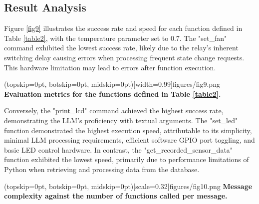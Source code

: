 \documentclass{ieeeaccess}
\begin{document}

\subsection{Result Analysis}
Figure \ref{fig9} illustrates the success rate and speed for each function defined in Table \ref{table2}, with the temperature parameter set to 0.7. The "set\_fan" command exhibited the lowest success rate, likely due to the relay's inherent switching delay causing errors when processing frequent state change requests. This hardware limitation may lead to errors after function execution.  

\Figure[h!](topskip=0pt, botskip=0pt,
midskip=0pt)[width=0.99\columnwidth]{{figures/fig9.png}}
{ \textbf{Evaluation metrics for the functions defined in Table \ref{table2}.}\label{fig9}}

Conversely, the "print\_lcd" command achieved the highest success rate, demonstrating the LLM's proficiency with textual arguments. The "set\_led" function demonstrated the highest execution speed, attributable to its simplicity, minimal LLM processing requirements, efficient software GPIO port toggling, and basic LED control hardware. In contrast, the "get\_recorded\_sensor\_data" function exhibited the lowest speed, primarily due to performance limitations of Python when retrieving and processing data from the database.

\Figure[t!](topskip=0pt, botskip=0pt,
midskip=0pt)[scale=0.32]{{figures/fig10.png}}
{ \textbf{Message complexity against the number of functions called per message.}\label{fig10}}
\end{document}
